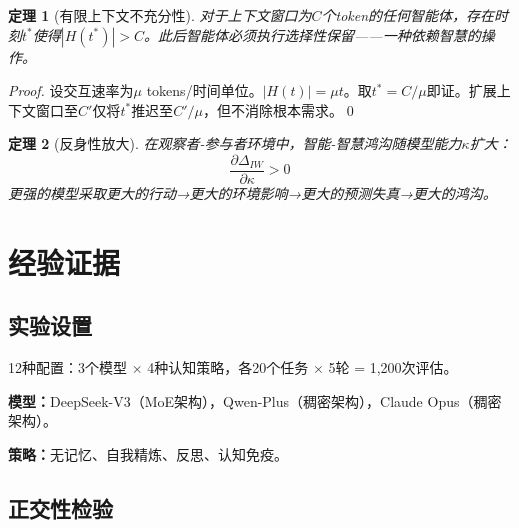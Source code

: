 \documentclass[11pt,a4paper]{article}
\newtheorem{theorem}{定理}
\begin{document}
\begin{theorem}[有限上下文不充分性]
\label{thm:context}
对于上下文窗口为$C$个token的任何智能体，存在时刻$t^*$使得$|H(t^*)| > C$。此后智能体必须执行选择性保留——一种依赖智慧的操作。
\end{theorem}

\begin{proof}
设交互速率为$\mu$ tokens/时间单位。$|H(t)| = \mu t$。取$t^* = C/\mu$即证。扩展上下文窗口至$C'$仅将$t^*$推迟至$C'/\mu$，但不消除根本需求。\qed
\end{proof}

\begin{theorem}[反身性放大]
\label{thm:reflexive}
在观察者-参与者环境中，智能-智慧鸿沟随模型能力$\kappa$\emph{扩大}：
\begin{equation}
  \frac{\partial \Delta_{IW}}{\partial \kappa} > 0
\end{equation}
更强的模型采取更大的行动→更大的环境影响→更大的预测失真→更大的鸿沟。
\end{theorem}

\section{经验证据}
\label{sec:empirical}

\subsection{实验设置}
12种配置：3个模型 $\times$ 4种认知策略，各20个任务 $\times$ 5轮 = 1,200次评估。

\textbf{模型：}DeepSeek-V3（MoE架构），Qwen-Plus（稠密架构），Claude Opus（稠密架构）。

\textbf{策略：}无记忆、自我精炼、反思、认知免疫。

\subsection{正交性检验}
\end{document}
